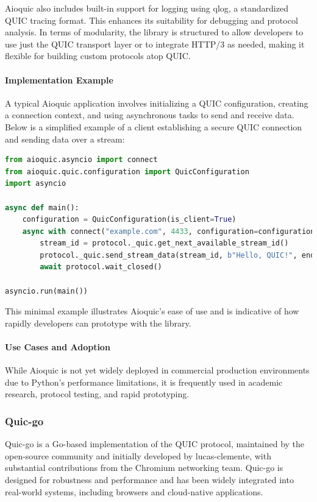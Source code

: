 Aioquic also includes built-in support for logging using qlog, a standardized QUIC tracing format. This enhances its suitability for debugging and protocol analysis. In terms of modularity, the library is structured to allow developers to use just the QUIC transport layer or to integrate HTTP/3 as needed, making it flexible for building custom protocols atop QUIC.

\paragraph{Implementation Example}
A typical Aioquic application involves initializing a QUIC configuration, creating a connection context, and using asynchronous tasks to send and receive data. Below is a simplified example of a client establishing a secure QUIC connection and sending data over a stream:

\begin{lstlisting}[language=python]
from aioquic.asyncio import connect
from aioquic.quic.configuration import QuicConfiguration
import asyncio

async def main():
    configuration = QuicConfiguration(is_client=True)
    async with connect("example.com", 4433, configuration=configuration) as protocol:
        stream_id = protocol._quic.get_next_available_stream_id()
        protocol._quic.send_stream_data(stream_id, b"Hello, QUIC!", end_stream=True)
        await protocol.wait_closed()

asyncio.run(main())
\end{lstlisting}

This minimal example illustrates Aioquic's ease of use and is indicative of how rapidly developers can prototype with the library.

\paragraph{Use Cases and Adoption}
While Aioquic is not yet widely deployed in commercial production environments due to Python's performance limitations, it is frequently used in academic research, protocol testing, and rapid prototyping.

\subsubsection{Quic-go}
Quic-go is a Go-based implementation of the QUIC protocol, maintained by the open-source community and initially developed by lucas-clemente, with substantial contributions from the Chromium networking team. Quic-go is designed for robustness and performance and has been widely integrated into real-world systems, including browsers and cloud-native applications.

